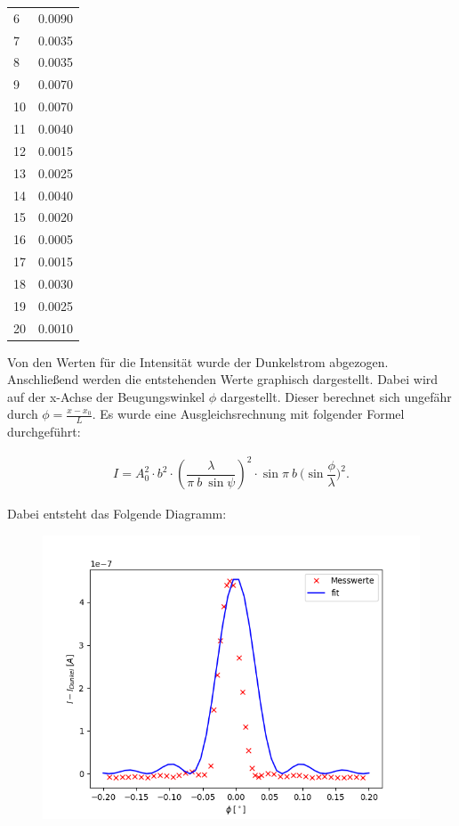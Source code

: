\begin{minipage}{\linewidth}
\begin{table}[H]
\begin{tabular}{ll}
        6    &   0.0090  \\ 
        7    &   0.0035 \\ 
        8    &   0.0035 \\ 
        9    &   0.0070  \\ 
        10   &   0.0070  \\ 
        11   &   0.0040  \\ 
        12   &   0.0015 \\ 
        13   &   0.0025 \\ 
        14   &   0.0040  \\ 
        15   &   0.0020  \\ 
        16   &   0.0005 \\ 
        17   &   0.0015 \\ 
        18   &   0.0030  \\ 
        19   &   0.0025 \\ 
        20   &   0.0010  \\ 
        \bottomrule   
    \end{tabular}
    
    \label{tab:1}
\end{table}
\end{minipage}

Von den Werten für die Intensität wurde der Dunkelstrom abgezogen. Anschließend werden die entstehenden Werte graphisch dargestellt. Dabei wird auf der x-Achse der Beugungswinkel $\phi$ dargestellt. Dieser berechnet sich ungefähr durch $\phi = \frac{x-x_0}{L}$. Es wurde eine Ausgleichsrechnung mit folgender Formel durchgeführt:

\begin{align*}
    I=A_0^2\cdot b^2\cdot (\dfrac{\lambda}{\pi \ b \ \sin{\psi}})^2 \cdot \sin{\pi \ b \ (\sin{\dfrac{\phi}{\lambda}}})^2.
\end{align*}

Dabei entsteht das Folgende Diagramm:

\begin{figure}[H]
    \centering
    \includegraphics{einzel.png}
\end{figure}

